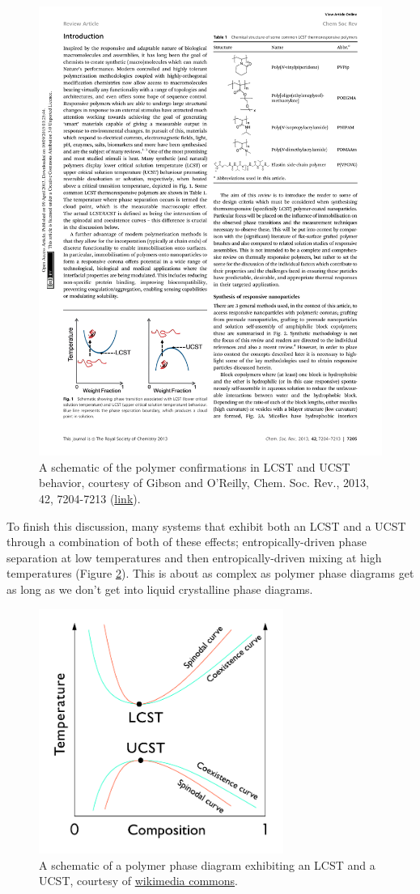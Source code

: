 \documentclass[12pt]{article}
\begin{document}
\begin{figure}[h]
\centering
\includegraphics[width=12cm]{LCST_UCST_sketch}
\caption{A schematic of the polymer confirmations in LCST and UCST behavior, courtesy of Gibson and O'Reilly, Chem. Soc. Rev., 2013, 42, 7204-7213 (\href{http://pubs.rsc.org/en/content/articlehtml/2013/cs/c3cs60035a}{link}).}
\label{LCST_UCST_illustration}
\end{figure}

To finish this discussion, many systems that exhibit both an LCST and a UCST through a combination of both of these effects; entropically-driven phase separation at low temperatures and then entropically-driven mixing at high temperatures (Figure \ref{LCST_and_UCST}). This is about as complex as polymer phase diagrams get as long as we don't get into liquid crystalline phase diagrams.

\begin{figure}[h]
\centering
\includegraphics[width=8cm]{LCST-UCST_plot}
\caption{A schematic of a polymer phase diagram exhibiting an LCST and a UCST, courtesy of \href{https://commons.wikimedia.org/wiki/File:LCST-UCST_plot.svg}{wikimedia commons}.}
\label{LCST_and_UCST}
\end{figure}
\end{document}
